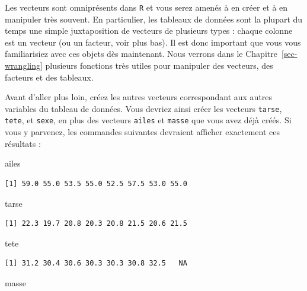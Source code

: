 \documentclass[
  a4paper,
  DIV=11,
  numbers=noendperiod,
  oneside]{scrreprt}
\newenvironment{Shaded}{}{}
\newcommand{\NormalTok}[1]{\textcolor[rgb]{0.14,0.16,0.18}{#1}}
\begin{document}
Les vecteurs sont omniprésents dans \texttt{R} et vous serez amenés à en
créer et à en manipuler très souvent. En particulier, les tableaux de
données sont la plupart du temps une simple juxtaposition de vecteurs de
plusieurs types : chaque colonne est un vecteur (ou un facteur, voir
plus bas). Il est donc important que vous vous familiarisiez avec ces
objets dès maintenant. Nous verrons dans le Chapitre~\ref{sec-wrangling}
plusieurs fonctions très utiles pour manipuler des vecteurs, des
facteurs et des tableaux.

Avant d'aller plus loin, créez les autres vecteurs correspondant aux
autres variables du tableau de données. Vous devriez ainsi créer les
vecteurs \texttt{tarse}, \texttt{tete}, et \texttt{sexe}, en plus des
vecteurs \texttt{ailes} et \texttt{masse} que vous avez déjà créés. Si
vous y parvenez, les commandes suivantes devraient afficher exactement
ces résultats :

\begin{Shaded}
\begin{Highlighting}[]
\NormalTok{ailes}
\end{Highlighting}
\end{Shaded}

\begin{verbatim}
[1] 59.0 55.0 53.5 55.0 52.5 57.5 53.0 55.0
\end{verbatim}

\begin{Shaded}
\begin{Highlighting}[]
\NormalTok{tarse}
\end{Highlighting}
\end{Shaded}

\begin{verbatim}
[1] 22.3 19.7 20.8 20.3 20.8 21.5 20.6 21.5
\end{verbatim}

\begin{Shaded}
\begin{Highlighting}[]
\NormalTok{tete}
\end{Highlighting}
\end{Shaded}

\begin{verbatim}
[1] 31.2 30.4 30.6 30.3 30.3 30.8 32.5   NA
\end{verbatim}

\begin{Shaded}
\begin{Highlighting}[]
\NormalTok{masse}
\end{Highlighting}
\end{Shaded}
\end{document}
